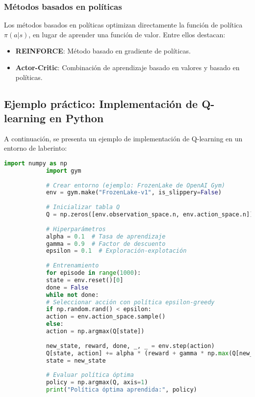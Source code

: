 \begin{itemize}
		\subsubsection{Métodos basados en políticas}
		
		Los métodos basados en políticas optimizan directamente la función de política \( \pi(a | s) \), en lugar de aprender una función de valor. Entre ellos destacan:
		
		\begin{itemize}
			\item \textbf{REINFORCE}: Método basado en gradiente de políticas.
			\item \textbf{Actor-Critic}: Combinación de aprendizaje basado en valores y basado en políticas.
		\end{itemize}
		
		\subsection{Ejemplo práctico: Implementación de Q-learning en Python}
		
		A continuación, se presenta un ejemplo de implementación de Q-learning en un entorno de laberinto:
		
		\begin{lstlisting}[language=Python, caption={Q-learning en un entorno de laberinto}]
			import numpy as np
			import gym
			
			# Crear entorno (ejemplo: FrozenLake de OpenAI Gym)
			env = gym.make("FrozenLake-v1", is_slippery=False)
			
			# Inicializar tabla Q
			Q = np.zeros([env.observation_space.n, env.action_space.n])
			
			# Hiperparámetros
			alpha = 0.1  # Tasa de aprendizaje
			gamma = 0.9  # Factor de descuento
			epsilon = 0.1  # Exploración-explotación
			
			# Entrenamiento
			for episode in range(1000):
			state = env.reset()[0]
			done = False
			while not done:
			# Seleccionar acción con política epsilon-greedy
			if np.random.rand() < epsilon:
			action = env.action_space.sample()
			else:
			action = np.argmax(Q[state])
			
			new_state, reward, done, _, _ = env.step(action)
			Q[state, action] += alpha * (reward + gamma * np.max(Q[new_state]) - Q[state, action])
			state = new_state
			
			# Evaluar política óptima
			policy = np.argmax(Q, axis=1)
			print("Política óptima aprendida:", policy)
		\end{lstlisting}
		

\end{itemize}
